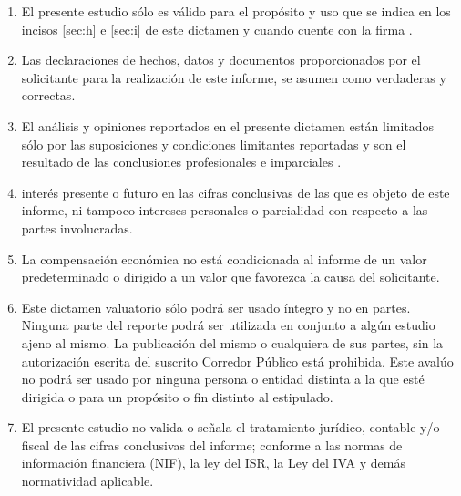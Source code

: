 \begin{enumerate}
	\item El presente estudio s\'olo es v\'alido para el prop\'osito y uso que se indica en los incisos \ref{sec:h} e \ref{sec:i} de este dictamen y cuando cuente con la firma .
	\item Las declaraciones de hechos, datos y documentos proporcionados por el solicitante para la realizaci\'on de este informe, se asumen como verdaderas y correctas.
	\item El an\'alisis y opiniones reportados en el presente dictamen est\'an limitados s\'olo por las suposiciones y condiciones limitantes reportadas y son el resultado de las conclusiones profesionales e imparciales  .
	\item  {} inter\'es presente o futuro en las cifras conclusivas de las que es objeto de este informe, ni tampoco   intereses personales o parcialidad con respecto a las partes involucradas.
	\item La compensaci\'on econ\'omica   no est\'a condicionada al informe de un valor predeterminado o dirigido a un valor que favorezca la causa del solicitante.
	\item Este dictamen valuatorio s\'olo podr\'a ser usado \'integro y no en partes. Ninguna parte del reporte podr\'a ser utilizada en conjunto a alg\'un estudio ajeno al mismo. La publicaci\'on del mismo o cualquiera de sus partes, sin la autorizaci\'on escrita del suscrito Corredor P\'ublico est\'a prohibida. Este aval\'uo no podr\'a ser usado por ninguna persona o entidad distinta a la que est\'e dirigida o para un prop\'osito o fin distinto al estipulado.
	\item El presente estudio no valida o se\~nala el tratamiento jur\'idico, contable y/o fiscal de las cifras conclusivas del informe; conforme a las normas de informaci\'on financiera (NIF), la ley del ISR, la Ley del IVA y dem\'as normatividad aplicable.

\end{enumerate}